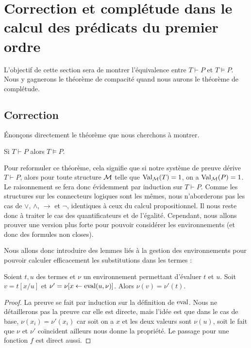 \section{Correction et complétude dans le calcul des prédicats du premier ordre}

L'objectif de cette section sera de montrer l'équivalence entre $T\vdash P$ et $T\vDash P$. Nous y gagnerons le théorème de compacité quand nous aurons le théorème de complétude.

\subsection{Correction}

\'Enonçons directement le théorème que nous cherchons à montrer.

\begin{them}[Correction]
    Si $T\vdash P$ alors $T\vDash P$.
\end{them}

Pour reformuler ce théorème, cela signifie que si notre système de preuve dérive $T\vdash P$, alors pour toute structure $\mathcal M$ telle que $\mathrm{Val}_{\mathcal M}(T)=1$, on a $\mathrm{Val}_{\mathcal M}(P) = 1$. Le raisonnement se fera donc évidemment par induction sur $T\vdash P$. Comme les structures sur les connecteurs logiques sont les mêmes, nous n'aborderons pas les cas de $\lor$, $\land$, $\to$ et $\lnot$, identiques à ceux du calcul propositionnel. Il nous reste donc à traiter le cas des quantificateurs et de l'égalité. Cependant, nous allons prouver une version plus forte pour pouvoir considérer les environnements (et donc des formules non closes).

Nous allons donc introduire des lemmes liés à la gestion des environnements pour pouvoir calculer efficacement les substitutions dans les termes :

\begin{lem}
    Soient $t,u$ des termes et $\nu$ un environnement permettant d'évaluer $t$ et $u$. Soit $v = t[x/u]$ et $\nu' = \nu[x \leftarrow \mathrm{eval}(u,\nu)]$. Alors $\nu(v) = \nu'(t)$.
\end{lem}

\begin{proof}
    La preuve se fait par induction sur la définition de $\mathrm{eval}$. Nous ne détaillerons pas la preuve car elle est directe, mais l'idée est que dans le cas de base, $\nu(x_i)=\nu'(x_i)$ car soit on a $x$ et les deux valeurs sont $\nu(u)$, soit le fait que $\nu$ et $\nu'$ coïncident ailleurs nous donne la propriété. Le passage pour une fonction $f$ est direct aussi.
\end{proof}

